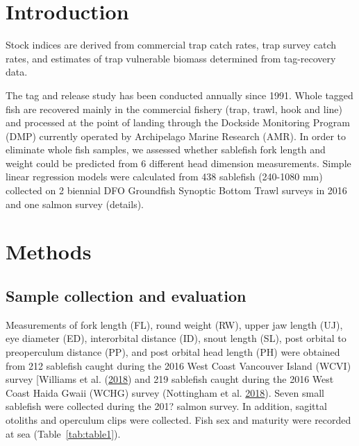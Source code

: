 \documentclass[12pt]{article}\usepackage[]{graphicx}\usepackage[]{color}
\begin{document}

\frontmatter


\renewcommand{\headrulewidth}{0.5pt}  %
\renewcommand{\footrulewidth}{0.5pt}  %

\hypertarget{introduction}{%
\section{Introduction}\label{introduction}}

Stock indices are derived from commercial trap catch rates, trap survey catch rates, and estimates of trap vulnerable biomass determined from tag-recovery data.

The tag and release study has been conducted annually since 1991. Whole tagged fish are recovered mainly in the commercial fishery (trap, trawl, hook and line) and processed at the point of landing through the Dockside Monitoring Program (DMP) currently operated by Archipelago Marine Research (AMR). In order to eliminate whole fish samples, we assessed whether sablefish fork length and weight could be predicted from 6 different head dimension measurements. Simple linear regression models were calculated from 438 sablefish (240-1080 mm) collected on 2 biennial DFO Groundfish Synoptic Bottom Trawl surveys in 2016 and one salmon survey (details).

\hypertarget{methods}{%
\section{Methods}\label{methods}}

\hypertarget{sample-collection-and-evaluation}{%
\subsection{Sample collection and evaluation}\label{sample-collection-and-evaluation}}

Measurements of fork length (FL), round weight (RW), upper jaw length (UJ), eye diameter (ED), interorbital distance (ID), snout length (SL), post orbital to preoperculum distance (PP), and post orbital head length (PH) were obtained from 212 sablefish caught during the 2016 West Coast Vancouver Island (WCVI) survey {[}Williams et al. (\protect\hyperlink{ref-Williams2018}{2018}) and 219 sablefish caught during the 2016 West Coast Haida Gwaii (WCHG) survey (Nottingham et al. \protect\hyperlink{ref-Nottingham2018}{2018}). Seven small sablefish were collected during the 201? salmon survey. In addition, sagittal otoliths and operculum clips were collected. Fish sex and maturity were recorded at sea (Table~\ref{tab:table1}).
\end{document}
